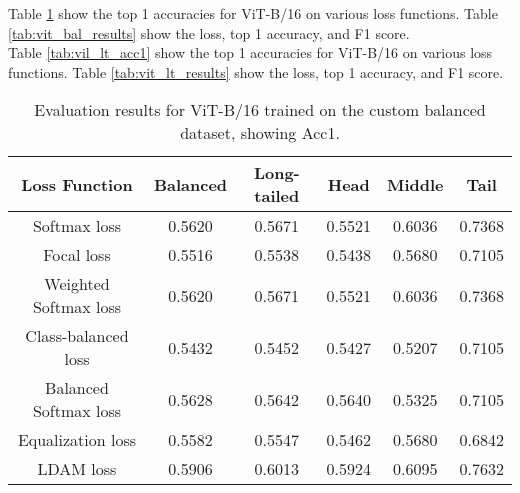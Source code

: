Table \ref{tab:vit_bal_acc1} show the top 1 accuracies for ViT-B/16 on various loss functions. Table \ref{tab:vit_bal_results} show the loss, top 1 accuracy, and F1 score.\\

Table \ref{tab:vil_lt_acc1} show the top 1 accuracies for ViT-B/16 on various loss functions. Table \ref{tab:vit_lt_results} show the loss, top 1 accuracy, and F1 score.

\begin{table}[H]
    \centering
    \begin{tabular}{cccccc}
        \toprule
        Loss Function & Balanced & Long-tailed & Head & Middle & Tail \\ 
        \midrule
        Softmax loss   & 0.5620 & 0.5671 & 0.5521 & 0.6036 & 0.7368 \\
        Focal loss   & 0.5516 & 0.5538 & 0.5438 & 0.5680 & 0.7105 \\
        Weighted Softmax loss   & 0.5620 & 0.5671 & 0.5521 & 0.6036 & 0.7368 \\
        Class-balanced loss   & 0.5432 & 0.5452 & 0.5427 & 0.5207 & 0.7105 \\
        Balanced Softmax loss   & 0.5628 & 0.5642 & 0.5640 & 0.5325 & 0.7105 \\
        Equalization loss   & 0.5582 & 0.5547 & 0.5462 & 0.5680 & 0.6842 \\
        LDAM loss   & 0.5906 &  0.6013 & 0.5924 & 0.6095 & 0.7632 \\
        \bottomrule
    \end{tabular}
    \caption{Evaluation results for ViT-B/16 trained on the custom balanced dataset, showing Acc1.}
    \label{tab:vit_bal_acc1}
\end{table}

